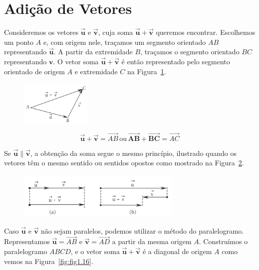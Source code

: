 \section{Adição de Vetores}

Consideremos os vetores $\mathbf{\overrightarrow{u}}$ e
$\mathbf{\overrightarrow{v}}$, cuja soma $\mathbf{\overrightarrow{u}} +
\mathbf{\overrightarrow{v}}$ queremos encontrar. Escolhemos um ponto $A$ e, com
origem nele, traçamos um segmento orientado $AB$ representando
$\mathbf{\overrightarrow{u}}$. A partir da extremidade $B$, traçamos o segmento
orientado $BC$ representando $\mathbf{v}$. O vetor soma
$\mathbf{\overrightarrow{u}} + \mathbf{\overrightarrow{v}}$ é então representado
pelo segmento orientado de origem $A$ e extremidade $C$ na
Figura~\ref{fig:fig1.14}.

\begin{figure}[H]
    \centering
    \includegraphics[width=0.3\textwidth]{./fig/fig1.14.png}
    \caption{}\label{fig:fig1.14}
\end{figure}

\[
  \mathbf{\overrightarrow{u}} + \mathbf{\overrightarrow{v}} = \overrightarrow{AB}
  \, \text{ou} \,
  \mathbf{\overrightarrow{AB}} + \mathbf{\overrightarrow{BC}} = \overrightarrow{AC}
\]

Se $\mathbf{\overrightarrow{u}} \parallel \mathbf{\overrightarrow{v}}$, a
obtenção da soma segue o mesmo princípio, ilustrado quando os vetores têm o
mesmo sentido ou sentidos opostos como mostrado na Figura~\ref{fig:fig1.15}.

\begin{figure}[H]
    \centering
    \includegraphics[width=0.7\textwidth]{./fig/fig1.15.png}
    \caption{}\label{fig:fig1.15}
\end{figure}

Caso $\mathbf{\overrightarrow{u}}$ e $\mathbf{\overrightarrow{v}}$ não sejam
paralelos, podemos utilizar o método do paralelogramo. Representamos
$\mathbf{\overrightarrow{u}} = \overrightarrow{AB}$ e
$\mathbf{\overrightarrow{v}} = \overrightarrow{AD}$ a partir da mesma origem
$A$. Construímos o paralelogramo $ABCD$, e o vetor soma
$\mathbf{\overrightarrow{u}} + \mathbf{\overrightarrow{v}}$ é a diagonal de
origem $A$ como vemos na Figura~\ref{fig:fig1.16}.

